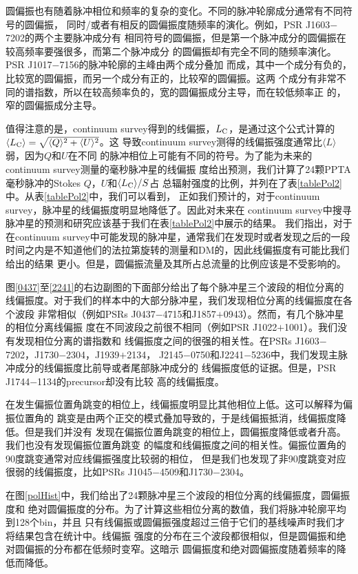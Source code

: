 圆偏振也有随着脉冲相位和频率的复杂的变化。不同的脉冲轮廓成分通常有不同符号的圆偏振，
同时/或者有相反的圆偏振度随频率的演化。例如，PSR J1603$-$7202的两个主要脉冲成分有
相同符号的圆偏振，但是第一个脉冲成分的圆偏振在较高频率要强很多，而第二个脉冲成分
的圆偏振却有完全不同的随频率演化。PSR J1017$-$7156的脉冲轮廓的主峰由两个成分叠加
而成，其中一个成分有负的，比较宽的圆偏振，而另一个成分有正的，比较窄的圆偏振。这两
个成分有非常不同的谱指数，所以在较高频率负的，宽的圆偏振成分主导，而在较低频率正
的，窄的圆偏振成分主导。

值得注意的是，continuum survey得到的线偏振，$L_{\rm{C}}$，是通过这个公式计算的
$\langle L_{\rm{C}}\rangle = \sqrt{\langle Q\rangle^{2}+\langle U\rangle^{2}}$。这
导致continuum survey测得的线偏振强度通常比$\langle L\rangle$弱，因为$Q$和$U$在不同
的脉冲相位上可能有不同的符号。为了能为未来的continuum survey测量的毫秒脉冲星的线偏振
度给出预测，我们计算了24颗PPTA毫秒脉冲的Stokes $Q$，$U$和$\langle L_{\rm{C}} \rangle/S$占
总辐射强度的比例，并列在了表\ref{tablePol2}中。从表\ref{tablePol2}中，我们可以看到，
正如我们预计的，对于continuum survey，脉冲星的线偏振度明显地降低了。因此对未来在
continuum survey中搜寻脉冲星的预测和研究应该基于我们在表\ref{tablePol2}中展示的结果。
我们指出，对于在continuum survey中可能发现的脉冲星，通常我们在发现时或者发现之后的一段
时间之内是不知道他们的法拉第旋转的测量和DM的，因此线偏振度有可能比我们给出的结果
更小。但是，圆偏振流量及其所占总流量的比例应该是不受影响的。

图\ref{0437}至\ref{2241}的右边副图的下面部分给出了每个脉冲星三个波段的相位分离的
线偏振度。对于我们的样本中的大部分脉冲星，我们发现相位分离的线偏振度在各个波段
非常相似（例如PSRs J0437$-$4715和J1857$+$0943）。然而，有几个脉冲星的相位分离线偏振
度在不同波段之前很不相同（例如PSR J1022$+$1001）。我们没有发现相位分离的谱指数和
线偏振度之间的很强的相关性。在PSRs J1603$-$7202，J1730$-$2304，J1939$+$2134，
J2145$-$0750和J2241$-$5236中，我们发现主脉冲成分的线偏振度比前导或者尾部脉冲成分的
线偏振度低的证据\supercite{Basu15}。但是，PSR J1744$-$1134的precursor却没有比较
高的线偏振度。

在发生偏振位置角跳变的相位上，线偏振度明显比其他相位上低。这可以解释为偏振位置角的
跳变是由两个正交的模式叠加导致的，于是线偏振抵消，线偏振度降低。但是我们并没有
发现在偏振位置角跳变的相位上，圆偏振度降低或者升高。我们也没有发现偏振位置角跳变
的幅度和线偏振度之间的相关性。偏振位置角的90度跳变通常对应线偏振强度比较弱的相位，
但是我们也发现了非90度跳变对应很弱的线偏振度，比如PSRs J1045$-$4509和J1730$-$2304。

在图\ref{polHist}中，我们给出了24颗脉冲星三个波段的相位分离的线偏振度，圆偏振度和
绝对圆偏振度的分布。为了计算这些相位分离的数值，我们将脉冲轮廓平均到128个bin，并且
只有线偏振或圆偏振强度超过三倍于它们的基线噪声时我们才将结果包含在统计中。线偏振
强度的分布在三个波段都很相似，但是圆偏振和绝对圆偏振的分布都在低频时变窄。这暗示
圆偏振度和绝对圆偏振度随着频率的降低而降低。


